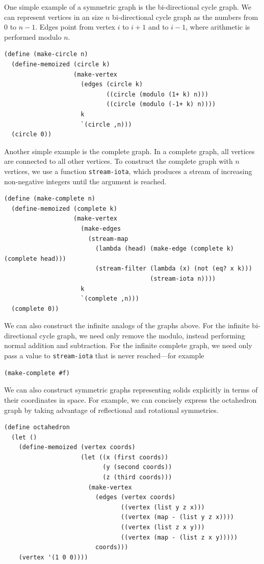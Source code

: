 \documentclass[11pt]{article} %
\theoremstyle{component}
\begin{document}
One simple example of a symmetric graph is the bi-directional cycle graph.  We can represent vertices in an size $n$ bi-directional cycle graph as the numbers from $0$ to $n-1$.  Edges point from vertex $i$ to $i+1$ and to $i-1$, where arithmetic is performed modulo $n$.

\begin{verbatim}
(define (make-circle n)
  (define-memoized (circle k)
                   (make-vertex
                     (edges (circle k)
                            ((circle (modulo (1+ k) n)))
                            ((circle (modulo (-1+ k) n))))
                     k
                     `(circle ,n)))
  (circle 0))
\end{verbatim}

Another simple example is the complete graph.  In a complete graph, all vertices are connected to all other vertices.  To construct the complete graph with $n$ vertices, we use a function \verb|stream-iota|, which produces a stream of increasing non-negative integers until the argument is reached.

\begin{verbatim}
(define (make-complete n)
  (define-memoized (complete k)
                   (make-vertex
                     (make-edges
                       (stream-map
                         (lambda (head) (make-edge (complete k) (complete head)))
                         (stream-filter (lambda (x) (not (eq? x k)))
                                        (stream-iota n))))
                     k
                     `(complete ,n)))
  (complete 0))
\end{verbatim}

We can also construct the infinite analogs of the graphs above.  For the infinite bi-directional cycle graph, we need only remove the modulo, instead performing normal addition and subtraction.  For the infinite complete graph, we need only pass a value to \verb|stream-iota| that is never reached---for example

\begin{verbatim}
(make-complete #f)
\end{verbatim}

We can also construct symmetric graphs representing solids explicitly in terms of their coordinates in space.  For example, we can concisely express the octahedron graph by taking advantage of reflectional and rotational symmetries.

\begin{verbatim}
(define octahedron
  (let ()
    (define-memoized (vertex coords)
                     (let ((x (first coords))
                           (y (second coords))
                           (z (third coords)))
                       (make-vertex
                         (edges (vertex coords)
                                ((vertex (list y z x)))
                                ((vertex (map - (list y z x))))
                                ((vertex (list z x y)))
                                ((vertex (map - (list z x y)))))
                         coords)))
    (vertex '(1 0 0))))
\end{verbatim}
\end{document}
